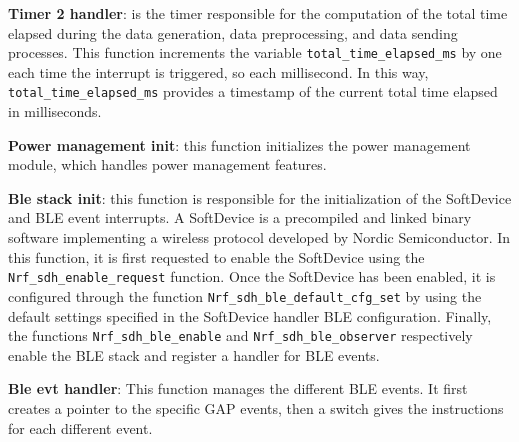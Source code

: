 \documentclass{Configuration_Files/PoliMi3i_thesis}
\begin{document}
\textbf{Timer 2 handler}: \quad is the timer responsible for the computation of the total time elapsed during the data generation, data preprocessing, and data sending processes. This function increments the variable \texttt{total\_time\_elapsed\_ms} by one each time the interrupt is triggered, so each millisecond. In this way, \texttt{total\_time\_elapsed\_ms} provides a timestamp of the current total time elapsed in milliseconds.


\textbf{Power management init}: \quad this function initializes the power management module, which handles power management features. \cite{NordicSemiconductorInfocenterb}

\textbf{Ble stack init}: \quad this function is responsible for the initialization of the SoftDevice and BLE event interrupts. A SoftDevice is a precompiled and linked binary software implementing a wireless protocol developed by Nordic Semiconductor. \cite{NordicSemiconductorInfocenterc} In this function, it is first requested to enable the SoftDevice using the \texttt{Nrf\_sdh\_enable\_request} function. Once the SoftDevice has been enabled, it is configured through the function \texttt{Nrf\_sdh\_ble\_default\_cfg\_set} by using the default settings specified in the SoftDevice handler BLE configuration. Finally, the functions \texttt{Nrf\_sdh\_ble\_enable} and \texttt{Nrf\_sdh\_ble\_observer} respectively enable the BLE stack and register a handler for BLE events.

\textbf{Ble evt handler}: This function manages the different BLE events. It first creates a pointer to the specific GAP events, then a switch gives the instructions for each different event.
\end{document}

